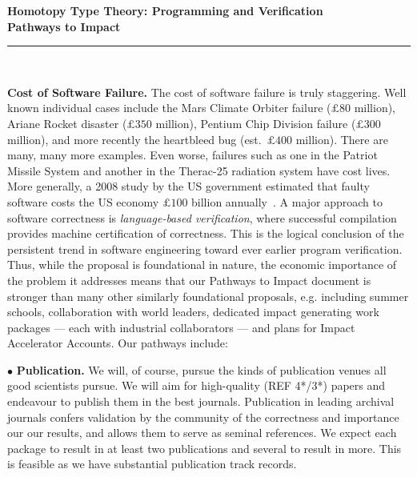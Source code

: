 \documentclass[a4paper,11pt]{article}
\begin{document}
\thispagestyle{plain}

\begin{center}

  {\Large {\bf Homotopy Type Theory: Programming and Verification \\
\vspace{0.2in} 
Pathways to Impact}}\\[1ex]   



\vspace*{-0.1in}



  \rule{150mm}{.5mm}\\[2ex]

\end{center}



\noindent



\vspace*{-0.1in}

{\bf Cost of Software Failure.} The cost of software failure is truly
staggering. Well known individual cases include the Mars Climate
Orbiter failure ($\pounds 80$ million), Ariane Rocket disaster
($\pounds 350$ million), Pentium Chip Division failure ($\pounds 300$
million), and more recently the heartbleed bug (est.\ $\pounds 400$
million).  There are many, many more examples. Even worse, 
failures such as one in the Patriot Missile System and
another in the Therac-25 radiation system have cost lives. More
generally, a 2008 study by the US government estimated that faulty
software costs the US economy $\pounds 100$ billion
annually~\cite{cnet08}.  A
major approach to software correctness is {\em language-based
  verification}, where successful compilation provides machine
certification of correctness. This is the logical conclusion of the
persistent trend in software engineering toward ever earlier program
verification. Thus, while the proposal is foundational in nature, the
economic importance of the problem it addresses means that our
Pathways to Impact document is stronger than many other similarly
foundational proposals, e.g. including summer schools, collaboration
with world leaders, dedicated impact generating work packages --- each
with industrial collaborators --- and plans for Impact Accelerator
Accounts. Our pathways include:

\vspace*{0.02in}

$\bullet$ {\bf Publication.} We will, of course, pursue the kinds of
publication venues all good scientists pursue. We will
aim for high-quality (REF 4*/3*) papers and endeavour to publish them in the best
journals. Publication in leading archival journals 
confers validation by the community of the correctness and importance
our our results, and allows them to serve as seminal references.
We expect each package to result in at least two
publications and several to result in more. This is feasible as we
have substantial publication track records.
\end{document}
